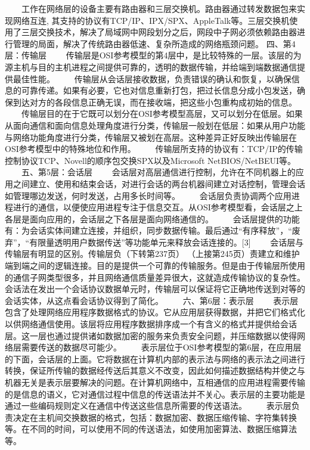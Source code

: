 　　工作在网络层的设备主要有路由器和三层交换机。路由器通过转发数据包来实现网络互连, 其支持的协议有TCP/IP、IPX/SPX、AppleTalk等。三层交换机使用了三层交换技术，解决了局域网中网段划分之后，网段中子网必须依赖路由器进行管理的局面，解决了传统路由器低速、复杂所造成的网络瓶颈问题。
        四、第4层：传输层
　　传输层是OSI参考模型的第4层中，是比较特殊的一层。该层的为源主机与目的主机进程之间提供可靠的，透明的数据传输，并给端到端数据通信提供最佳性能。
　　传输层从会话层接收数据，负责错误的确认和恢复，以确保信息的可靠传递。如果有必要，它也对信息重新打包，把过长信息分成小包发送，确保到达对方的各段信息正确无误，而在接收端，把这些小包重构成初始的信息。
　　传输层目的在于它既可以划分在OSI参考模型高层，又可以划分在低层。如果从面向通信和面向信息处理角度进行分类，传输层一般划在低层：如果从用户功能与网络功能角度进行分类，传输层又被划在高层。这种差异正好反映出传输层在OSI参考模型中的特殊地位和作用。
　　传输层所支持的协议有：TCP/IP的传输控制协议TCP、Novell的顺序包交换SPX以及Microsoft NetBIOS/NetBEUI等。
　　五、第5层：会话层
　　会话层对高层通信进行控制，允许在不同机器上的应用之间建立、使用和结束会话，对进行会话的两台机器间建立对话控制，管理会话如管理哪边发送，何时发送，占用多长时间等。
　　会话层负责协调两个应用进程进行的通信，以便使应用进程专注于信息交互。从OSI参考模型看，会话层之上各层是面向应用的，会话层之下各层是面向网络通信的。
　　会话层提供的功能有：为会话实体间建立连接，并组织，同步数据传输。最后通过“有序释放”，“废弃”，“有限量透明用户数据传送”等功能单元来释放会话连接的。[3]
　　会话层与传输层有明显的区别。传输层负（下转第237页）
（上接第245页）责建立和维护端到端之间的逻辑连接。目的是提供一个可靠的传输服务。但是由于传输层所使用的通信子网类型很多，并且网络通信质量差异很大，这就造成传输协议的复杂性。会话法在发出一个会话协议数据单元时，传输层可以保证将它正确地传送到对等的会话实体，从这点看会话协议得到了简化。
　　六、第6层：表示层
　　表示层包含了处理网络应用程序数据格式的协议。它从应用层获得数据，并把它们格式化以供网络通信使用。该层将应用程序数据排序成一个有含义的格式并提供给会话层。这一层也通过提供诸如数据加密的服务来负责安全问题，并压缩数据以使得网络层需要传送的数据尽可能少。
　　表示层位于OSI参考模型的第6层，在应用层的下面，会话层的上面。它将数据在计算机内部的表示法与网络的表示法之间进行转换，保证所传输的数据经传送后其意义不改变，因此如何描述数据结构并使之与机器无关是表示层要解决的问题。在计算机网络中，互相通信的应用进程需要传输的是信息的语义，它对通信过程中信息的传送语法并不关心。表示层的主要功能是通过一些编码规则定义在通信中传送这些信息所需要的传送语法。
　　表示层负责决定在主机间交换数据的格式，包括：数据加密、数据压缩传输、字符集转换等。在不同的时间，可以使用不同的传送语法，如使用加密算法、数据压缩算法等。
